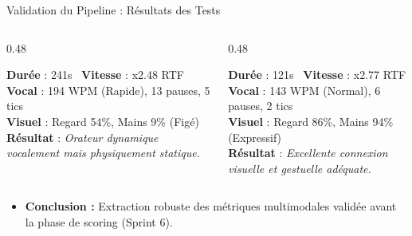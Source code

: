 \documentclass[10pt,aspectratio=169]{beamer}
\begin{document}
\begin{frame}{Validation du Pipeline : Résultats des Tests}
    \begin{columns}[T]
        \begin{column}{0.48\textwidth}
            \begin{tcolorbox}[title=Test 2 : Profil "Action", colframe=primary]
                \footnotesize
                \textbf{Durée} : 241s \textbar\ \textbf{Vitesse} : x2.48 RTF\\
                \textbf{Vocal} : 194 WPM (Rapide), 13 pauses, 5 tics\\
                \textbf{Visuel} : Regard 54\%, Mains 9\% (Figé)\\
                \textbf{Résultat} : \textit{Orateur dynamique vocalement mais physiquement statique.}
            \end{tcolorbox}
        \end{column}
        \begin{column}{0.48\textwidth}
            \begin{tcolorbox}[title=Test 5 : Profil "Posé", colframe=success]
                \footnotesize
                \textbf{Durée} : 121s \textbar\ \textbf{Vitesse} : x2.77 RTF\\
                \textbf{Vocal} : 143 WPM (Normal), 6 pauses, 2 tics\\
                \textbf{Visuel} : Regard 86\%, Mains 94\% (Expressif)\\
                \textbf{Résultat} : \textit{Excellente connexion visuelle et gestuelle adéquate.}
            \end{tcolorbox}
        \end{column}
    \end{columns}
    \vspace{0.4cm}
    \begin{itemize}
        \item \textbf{Conclusion :} Extraction robuste des métriques multimodales validée avant la phase de scoring (Sprint 6).
    \end{itemize}
\end{frame}
\end{document}
